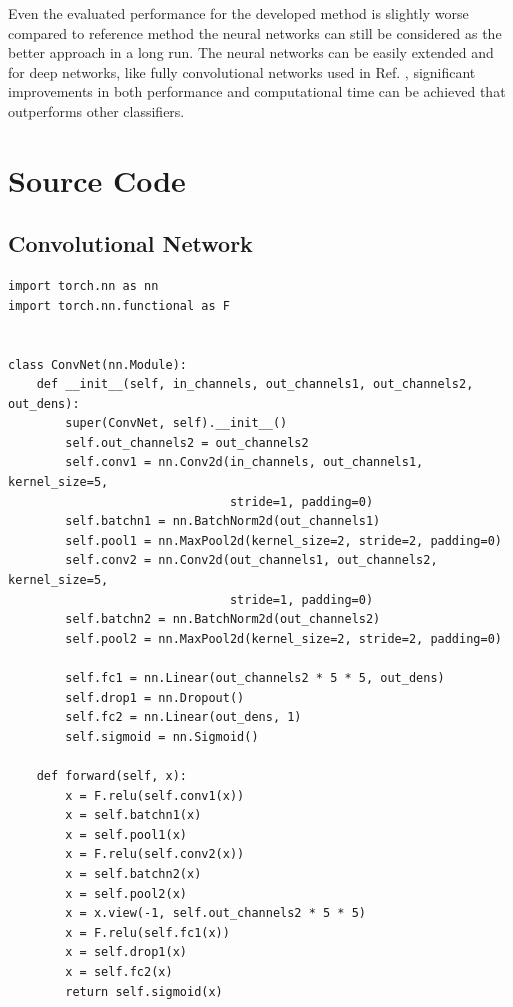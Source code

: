\documentclass[aps,prb,10pt,twocolumn,groupedaddress]{revtex4-1}
\begin{document}
Even the evaluated performance for the developed method is slightly worse compared to reference method the neural networks can still be considered as the better approach in a long run. The neural networks can be easily extended and for deep networks, like fully convolutional networks used in Ref. \cite{hu}, significant improvements in both performance and computational time can be achieved that outperforms other classifiers. 


\appendix
\onecolumngrid
\clearpage
\section{Source Code}
\label{appendix:a}
\lstset{language=Python}
\subsection{Convolutional Network}
\begin{lstlisting}
import torch.nn as nn
import torch.nn.functional as F


class ConvNet(nn.Module):
	def __init__(self, in_channels, out_channels1, out_channels2, out_dens):
		super(ConvNet, self).__init__()
		self.out_channels2 = out_channels2
		self.conv1 = nn.Conv2d(in_channels, out_channels1, kernel_size=5,
		                       stride=1, padding=0)
		self.batchn1 = nn.BatchNorm2d(out_channels1)
		self.pool1 = nn.MaxPool2d(kernel_size=2, stride=2, padding=0)
		self.conv2 = nn.Conv2d(out_channels1, out_channels2, kernel_size=5,
		                       stride=1, padding=0)
		self.batchn2 = nn.BatchNorm2d(out_channels2)
		self.pool2 = nn.MaxPool2d(kernel_size=2, stride=2, padding=0)

		self.fc1 = nn.Linear(out_channels2 * 5 * 5, out_dens)
		self.drop1 = nn.Dropout()
		self.fc2 = nn.Linear(out_dens, 1)
		self.sigmoid = nn.Sigmoid()

	def forward(self, x):
		x = F.relu(self.conv1(x))
		x = self.batchn1(x)
		x = self.pool1(x)
		x = F.relu(self.conv2(x))
		x = self.batchn2(x)
		x = self.pool2(x)
		x = x.view(-1, self.out_channels2 * 5 * 5)
		x = F.relu(self.fc1(x))
		x = self.drop1(x)
		x = self.fc2(x)
		return self.sigmoid(x)
\end{lstlisting}
\end{document}
